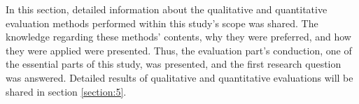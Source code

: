 In this section, detailed information about the qualitative and quantitative evaluation methods performed within this study's scope was shared. The knowledge regarding these methods' contents, why they were preferred, and how they were applied were presented. Thus, the evaluation part's conduction, one of the essential parts of this study, was presented, and the first research question was answered. Detailed results of qualitative and quantitative evaluations will be shared in section \ref{section:5}.